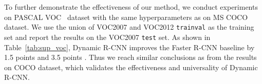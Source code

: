 \documentclass[runningheads]{llncs}
\begin{document}
To further demonstrate the effectiveness of our method, we conduct experiments on PASCAL VOC~\cite{PASCAL-VOC} dataset with the same hyperparameters as on MS COCO dataset. We use the union of VOC2007 and VOC2012 \texttt{trainval} as the training set and report the results on the VOC2007 \texttt{test} set. As shown in Table~\ref{tab:sup_voc}, Dynamic R-CNN improves the Faster R-CNN baseline by 1.5 points  and 3.5 points . Thus we reach similar conclusions as from the results on COCO dataset, which validates the effectiveness and universality of Dynamic R-CNN.
\end{document}
